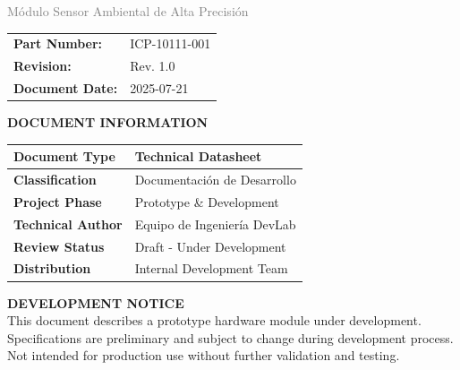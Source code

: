 \documentclass[11pt,a4paper]{article}
\begin{document}
\begin{titlepage}
    {\LARGE \textcolor{gray}{Módulo Sensor Ambiental de Alta Precisión}}\\[0.5cm]
    
    
    \begin{tcolorbox}[
        colback=gray!10!white,
        colframe=gray!50!black,
        width=0.7\textwidth,
        arc=1mm,
        boxrule=1pt
    ]
    \centering
    \begin{tabular}{l l}
    \textbf{Part Number:} & ICP-10111-001 \\
    \textbf{Revision:} & Rev. 1.0 \\
    \textbf{Document Date:} & 2025-07-21
    \end{tabular}
    \end{tcolorbox}
    
    \vspace{1cm}
    
    \begin{tcolorbox}[
        colback=white,
        colframe=black,
        width=0.9\textwidth,
        arc=0mm,
        boxrule=1pt,
        halign=center
    ]
    {\normalsize \textbf{DOCUMENT INFORMATION}}\\[0.3cm]
    \begin{tabular}{|l|l|}
    \hline
    \textbf{Document Type} & Technical Datasheet \\
    \hline
    \textbf{Classification} & Documentación de Desarrollo \\
    \hline
    \textbf{Project Phase} & Prototype \& Development \\
    \hline
    
    \textbf{Technical Author} & Equipo de Ingeniería DevLab \\
    \hline
    
    \textbf{Review Status} & Draft - Under Development \\
    \hline
    \textbf{Distribution} & Internal Development Team \\
    \hline
    \end{tabular}
    \end{tcolorbox}
    
    \vspace{0.8cm}
    
    \begin{tcolorbox}[
        colback=yellow!5!white,
        colframe=orange!75!black,
        width=\textwidth,
        arc=1mm,
        boxrule=1pt
    ]
    \centering
    {\small \textbf{DEVELOPMENT NOTICE}}\\[0.2cm]
    {\footnotesize This document describes a prototype hardware module under development.}\\
    {\footnotesize Specifications are preliminary and subject to change during development process.}\\
    {\footnotesize Not intended for production use without further validation and testing.}
    \end{tcolorbox}
    

\end{titlepage}
\end{document}
